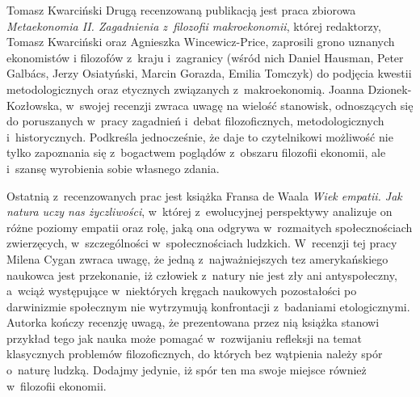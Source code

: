 \begin{editorial}{Tomasz Kwarciński}
Drugą recenzowaną publikacją jest praca zbiorowa \textit{Metaekonomia II. Zagadnienia z~filozofii makroekonomii}, której
redaktorzy, Tomasz Kwarciński oraz Agnieszka Wincewicz-Price, zaprosili grono uznanych ekonomistów i
filozofów z~kraju i~zagranicy (wśród nich Daniel Hausman, Peter Galbács, Jerzy Osiatyński, Marcin Gorazda, Emilia Tomczyk)
do podjęcia
kwestii metodologicznych oraz etycznych związanych z~makroekonomią. Joanna Dzionek-Kozłowska, w~swojej recenzji zwraca
uwagę na
wielość stanowisk, odnoszących się do poruszanych w~pracy zagadnień i~debat filozoficznych,
metodologicznych i~historycznych. Podkreśla jednocześnie, że daje to czytelnikowi
możliwość nie tylko zapoznania się z~bogactwem poglądów z~obszaru filozofii ekonomii, ale i~szansę wyrobienia sobie własnego zdania.

Ostatnią z~recenzowanych prac jest książka Fransa de Waala \textit{Wiek
empatii. Jak natura uczy nas życzliwości}, w~której z~ewolucyjnej
perspektywy analizuje on różne poziomy empatii oraz rolę, jaką ona
odgrywa w~rozmaitych społecznościach zwierzęcych, w~szczególności w~społecznościach
ludzkich. W~recenzji tej pracy Milena Cygan zwraca
uwagę, że jedną z~najważniejszych tez amerykańskiego naukowca jest
przekonanie, iż człowiek z~natury nie jest zły ani antyspołeczny, a~wciąż
występujące w~niektórych kręgach naukowych pozostałości po
darwinizmie społecznym nie wytrzymują konfrontacji z~badaniami
etologicznymi. Autorka kończy recenzję uwagą, że prezentowana
przez nią książka stanowi przykład tego jak nauka może pomagać w~rozwijaniu
refleksji na temat klasycznych problemów filozoficznych, do
których bez wątpienia należy spór o~naturę ludzką. Dodajmy jedynie, iż
spór ten ma swoje miejsce również w~filozofii ekonomii.

\end{editorial}